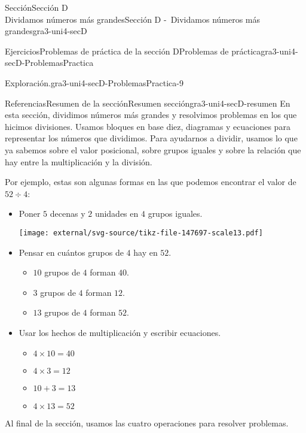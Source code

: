 \begin{sectionptx}{Sección}{{\Large Sección D\\}Dividamos números más grandes}{}{Sección D -~Dividamos números más grandes}{}{}{gra3-uni4-secD}
\begin{exercises-subsection}{Ejercicios}{Problemas de práctica de la sección D}{}{Problemas de práctica}{}{}{gra3-uni4-secD-ProblemasPractica}
\begin{divisionexercise}{7}{Exploración.}{}{gra3-uni4-secD-ProblemasPractica-9}
\begin{enumerate}[label={(\alph*)}]
\end{enumerate}
\end{divisionexercise}%
\end{exercises-subsection}
%
%
\typeout{************************************************}
\typeout{************************************************}
%
\begin{references-subsection}{Referencias}{Resumen de la sección}{}{Resumen sección}{}{}{gra3-uni4-secD-resumen}
En esta sección, dividimos números más grandes y resolvimos problemas en los que hicimos divisiones. Usamos bloques en base diez, diagramas y ecuaciones para representar los números que dividimos. Para ayudarnos a dividir, usamos lo que ya sabemos sobre el valor posicional, sobre grupos iguales y sobre la relación que hay entre la multiplicación y la división.%
\par
Por ejemplo, estas son algunas formas en las que podemos encontrar el valor de \(52 \div 4\):%
%
\begin{itemize}[label=\textbullet]
\item{}Poner \(5\) decenas y \(2\) unidades en \(4\) grupos iguales.%
\begin{image}{0}{1}{0}{}%
\texttt{[image: external/svg-source/tikz-file-147697-scale13.pdf]}
\end{image}%
\item{}Pensar en cuántos grupos de \(4\) hay en \(52\).%
%
\begin{itemize}[label=$\circ$]
\item{}\(10\) grupos de \(4\) forman \(40\).%
\item{}\(3\) grupos de \(4\) forman \(12\).%
\item{}\(13\) grupos de \(4\) forman \(52\).%
\end{itemize}
\item{}Usar los hechos de multiplicación y escribir ecuaciones.%
%
\begin{itemize}[label=$\circ$]
\item{}\(\displaystyle 4 \times 10 = 40\)%
\item{}\(\displaystyle 4 \times 3 = 12\)%
\item{}\(\displaystyle 10 + 3 = 13\)%
\item{}\(\displaystyle 4 \times 13 = 52\)%
\end{itemize}
\end{itemize}
Al final de la sección, usamos las cuatro operaciones para resolver problemas.%
\end{references-subsection}
\end{sectionptx}
